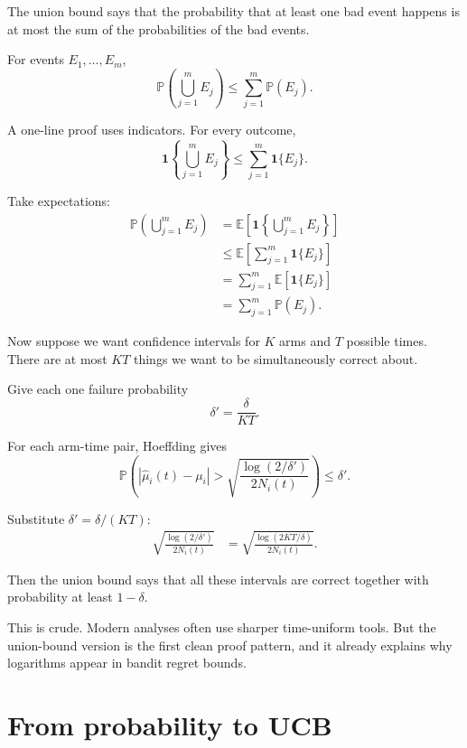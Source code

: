 \documentclass[en,nofont,11pt]{elegantbook}
\newcommand{\E}{\mathbb{E}}
\newcommand{\Pp}{\mathbb{P}}
\newcommand{\one}{\mathbf{1}}
\begin{document}
The union bound says that the probability that at least one bad event happens is at most the sum of the probabilities of the bad events.

For events $E_1,\ldots,E_m$,
\begin{equation}
\Pp\left(\bigcup_{j=1}^m E_j\right)\leq \sum_{j=1}^m \Pp(E_j). \label{eq:union_bound}
\end{equation}

A one-line proof uses indicators.  For every outcome,
\begin{equation}
\one\left\{\bigcup_{j=1}^m E_j\right\}
\leq
\sum_{j=1}^m \one\{E_j\}.
\end{equation}

Take expectations:
\begin{align}
\Pp\left(\bigcup_{j=1}^m E_j\right)
&= \E\left[\one\left\{\bigcup_{j=1}^m E_j\right\}\right] \\
&\leq \E\left[\sum_{j=1}^m \one\{E_j\}\right] \\
&= \sum_{j=1}^m \E[\one\{E_j\}] \\
&= \sum_{j=1}^m \Pp(E_j).
\end{align}

Now suppose we want confidence intervals for $K$ arms and $T$ possible times.  There are at most $KT$ things we want to be simultaneously correct about.

Give each one failure probability
\begin{equation}
\delta' = \frac{\delta}{KT}.
\end{equation}

For each arm-time pair, Hoeffding gives
\begin{equation}
\Pp\left(
|\widehat\mu_i(t)-\mu_i|>
\sqrt{\frac{\log(2/\delta')}{2N_i(t)}}
\right)
\leq \delta'.
\end{equation}

Substitute $\delta'=\delta/(KT)$:
\begin{align}
\sqrt{\frac{\log(2/\delta')}{2N_i(t)}}
&= \sqrt{\frac{\log(2KT/\delta)}{2N_i(t)}}. \label{eq:union_radius}
\end{align}

Then the union bound says that all these intervals are correct together with probability at least $1-\delta$.

This is crude.  Modern analyses often use sharper time-uniform tools.  But the union-bound version is the first clean proof pattern, and it already explains why logarithms appear in bandit regret bounds.

\chapter{From probability to UCB}
\end{document}

